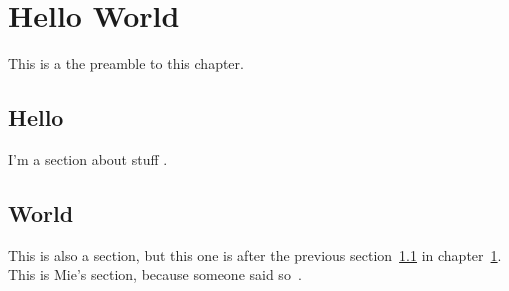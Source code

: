 \chapter{Hello World}\label{sec:hello-world}

This is a the preamble to this chapter.

\section{Hello}\label{sec:hello}

I'm a section about stuff \cite{dummy:1}.

\section{World}

This is also a section, but this one is after the previous section~\ref{sec:hello} in chapter~\ref{sec:hello-world}.
\\
This is Mie's section, because someone said so~\cite{rubow2000a}.
